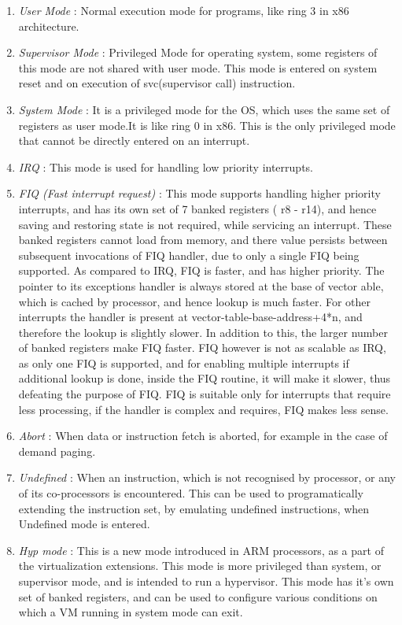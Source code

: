 \documentclass[seminar,twoside]{iitbreport}
\begin{document}
\begin{enumerate}
\item \emph{\textmd{User Mode }}: Normal execution mode for programs, like ring 3 in x86 architecture.\\
\item \emph{\textmd{Supervisor Mode}} : Privileged Mode for operating system, some registers of this mode are not shared with user mode. This mode is entered on system reset and on execution of svc(supervisor call) instruction.\\
\item \emph{\textmd{System Mode }}: It is a privileged mode for the OS, which uses the same set of registers as user mode.It is like ring 0 in x86. This is the only privileged mode that cannot be directly entered on an interrupt.
\\
\item \emph{\textmd{IRQ}} : This mode is used for handling low priority interrupts.
\\
\item \emph{\textmd{FIQ (Fast interrupt request) }} : This mode supports handling higher priority interrupts, and has its own set of 7 banked registers ( r8 - r14), and hence saving and restoring state is not required, while servicing an interrupt.
These banked registers cannot load from memory, and there value persists between subsequent invocations of FIQ handler, due to only a single FIQ being supported.
As compared to IRQ, FIQ is faster, and has higher priority. The pointer to its exceptions handler is always stored at the base of vector able, which is cached by processor, and hence
lookup is much faster. For other interrupts the handler is present at vector-table-base-address+4*n, and therefore the lookup is slightly slower. In addition to this, the larger
number of banked registers make FIQ faster. FIQ however is not as scalable as IRQ, as only one FIQ is supported, and for enabling multiple interrupts if additional lookup
is done, inside the FIQ routine, it will make it slower, thus defeating the purpose of FIQ. FIQ is suitable only for interrupts that require less processing, if the handler is
complex and requires, FIQ makes less sense. 
\\
\item \emph{\textmd{Abort }} : When data or instruction fetch is aborted, for example in the case of demand paging.
\\
\item \emph{\textmd{Undefined}} : When an instruction, which is not recognised by processor, or any of its co-processors is encountered. This can be used to programatically extending the instruction set, by emulating undefined instructions, when Undefined mode is entered.
\\
\item \emph{\textmd{Hyp mode}} : This is a new mode introduced in ARM processors, as a part of the virtualization extensions. This mode is more privileged than system, or supervisor mode, and is intended to run a hypervisor. This mode has it's own set of banked registers, and can be used to configure various conditions on which a VM running in system mode can exit.
\\
\end{enumerate}
\end{document}
